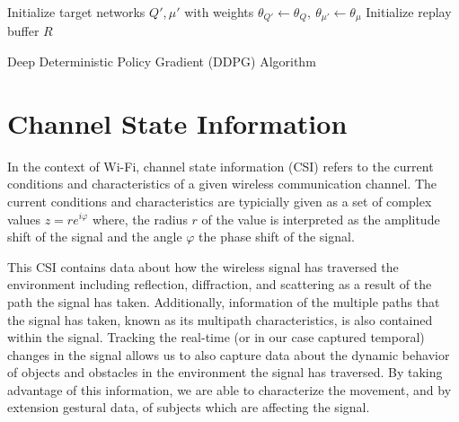 \begin{algorithm}
	\SetAlgoLined
	Initialize target networks $Q', \mu'$ with weights $\theta_{Q'} \leftarrow \theta_Q,~\theta_{\mu'} \leftarrow \theta_\mu$\;
	Initialize replay buffer $R$\;
	\caption{Deep Deterministic Policy Gradient (DDPG) Algorithm}\label{algo:ddpg}
\end{algorithm}

\section{Channel State Information}

In the context of Wi-Fi, channel state information (CSI) refers to the current conditions and characteristics of a given wireless communication channel.
The current conditions and characteristics are typicially given as a set of complex values $z = re^{i \varphi}$ where, the radius $r$ of the value is interpreted as the amplitude shift of the signal and the angle $\varphi$ the phase shift of the signal.

This CSI contains data about how the wireless signal has traversed the environment including reflection, diffraction, and scattering as a result of the path the signal has taken.
Additionally, information of the multiple paths that the signal has taken, known as its multipath characteristics, is also contained within the signal.
Tracking the real-time (or in our case captured temporal) changes in the signal allows us to also capture data about the dynamic behavior of objects and obstacles in the environment the signal has traversed. By taking advantage of this information, we are able to characterize the movement, and by extension gestural data, of subjects which are affecting the signal.

